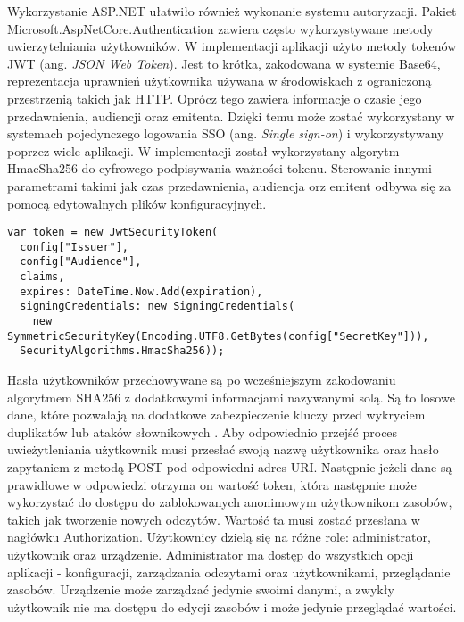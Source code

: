 Wykorzystanie ASP.NET ułatwiło również wykonanie systemu autoryzacji. 
Pakiet Microsoft.AspNetCore.Authentication zawiera często wykorzystywane metody
uwierzytelniania użytkowników. W implementacji aplikacji użyto metody tokenów JWT
(ang. \textit{JSON Web Token}). Jest to krótka, zakodowana w systemie Base64, 
reprezentacja uprawnień użytkownika używana w środowiskach z ograniczoną przestrzenią 
takich jak HTTP\cite{jwt:rfc7519}. Oprócz tego zawiera informacje o
czasie jego przedawnienia, audiencji oraz emitenta. Dzięki temu
może zostać wykorzystany w systemach pojedynczego logowania
SSO (ang. \textit{Single sign-on}) i wykorzystywany poprzez wiele aplikacji.
W implementacji został wykorzystany algorytm HmacSha256 do cyfrowego
podpisywania ważności tokenu. Sterowanie innymi parametrami takimi jak czas
przedawnienia, audiencja orz emitent odbywa się za pomocą edytowalnych
plików konfiguracyjnych.
\begin{lstlisting}
var token = new JwtSecurityToken(
  config["Issuer"],
  config["Audience"],
  claims,
  expires: DateTime.Now.Add(expiration),
  signingCredentials: new SigningCredentials(
    new SymmetricSecurityKey(Encoding.UTF8.GetBytes(config["SecretKey"])),
  SecurityAlgorithms.HmacSha256));
\end{lstlisting} 
Hasła użytkowników przechowywane są po wcześniejszym zakodowaniu algorytmem SHA256
z dodatkowymi informacjami nazywanymi solą. Są to losowe dane, które pozwalają na
dodatkowe zabezpieczenie kluczy przed wykryciem duplikatów lub ataków słownikowych
\cite{anderson2020security}.
Aby odpowiednio przejść proces uwieżytleniania użytkownik musi przesłać
swoją nazwę użytkownika oraz hasło zapytaniem z metodą POST pod odpowiedni adres
URI. Następnie jeżeli dane są prawidłowe w odpowiedzi otrzyma on wartość
token, która następnie może wykorzystać do dostępu do zablokowanych anonimowym
użytkownikom zasobów, takich jak tworzenie nowych odczytów. Wartość
ta musi zostać przesłana w nagłówku Authorization.
Użytkownicy dzielą się na różne role: administrator, użytkownik oraz urządzenie.
Administrator ma dostęp do wszystkich opcji aplikacji - konfiguracji, zarządzania odczytami
oraz użytkownikami, przeglądanie zasobów. Urządzenie może zarządzać jedynie swoimi
danymi, a zwykły użytkownik nie ma dostępu do edycji zasobów i może jedynie przeglądać
wartości.

